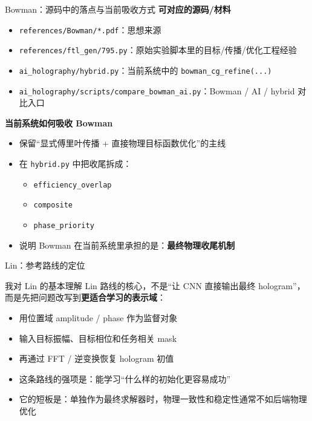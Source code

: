 \documentclass[aspectratio=169,10pt]{ctexbeamer}
\begin{document}
\begin{frame}{Bowman：源码中的落点与当前吸收方式}
  \textbf{可对应的源码/材料}
  \begin{itemize}
    \item \texttt{references/Bowman/*.pdf}：思想来源
    \item \texttt{references/ftl\_gen/795.py}：原始实验脚本里的目标/传播/优化工程经验
    \item \texttt{ai\_holography/hybrid.py}：当前系统中的 \texttt{bowman\_cg\_refine(...)}
    \item \texttt{ai\_holography/scripts/compare\_bowman\_ai.py}：Bowman / AI / hybrid 对比入口
  \end{itemize}

  \textbf{当前系统如何吸收 Bowman}
  \begin{itemize}
    \item 保留“显式傅里叶传播 + 直接物理目标函数优化”的主线
    \item 在 \texttt{hybrid.py} 中把收尾拆成：
    \begin{itemize}
      \item \texttt{efficiency\_overlap}
      \item \texttt{composite}
      \item \texttt{phase\_priority}
    \end{itemize}
    \item 说明 Bowman 在当前系统里承担的是：\textbf{最终物理收尾机制}
  \end{itemize}
\end{frame}

\begin{frame}{Lin：参考路线的定位}
  \begin{block}{我对 Lin 的基本理解}
    Lin 路线的核心，不是“让 CNN 直接输出最终 hologram”，而是先把问题改写到\textbf{更适合学习的表示域}：
    \begin{itemize}
      \item 用位置域 amplitude / phase 作为监督对象
      \item 输入目标振幅、目标相位和任务相关 mask
      \item 再通过 FFT / 逆变换恢复 hologram 初值
    \end{itemize}
  \end{block}

  \vspace{0.4em}
  \begin{itemize}
    \item 这条路线的强项是：能学习“什么样的初始化更容易成功”
    \item 它的短板是：单独作为最终求解器时，物理一致性和稳定性通常不如后端物理优化
  \end{itemize}
\end{frame}
\end{document}
